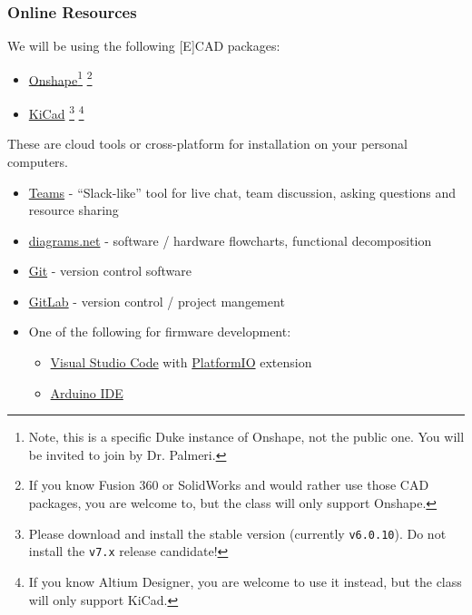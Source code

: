 \subsubsection*{Online Resources}
We will be using the following [E]CAD packages:
\begin{itemize}
    \item \href{https://duke.onshape.com}{Onshape}\footnote{Note, this is a
    specific Duke instance of Onshape, not the public one.  You will be invited
    to join by Dr. Palmeri.}
    \footnote{If you know Fusion 360 or SolidWorks and would rather use those CAD
    packages, you are welcome to, but the class will only support Onshape.}
    \item \href{https://kicad.org/}{KiCad}
    \footnote{Please download and install the stable version (currently \texttt{v6.0.10}). Do not install the
    \texttt{v7.x} release candidate!}
    \footnote{If you know Altium Designer, you are welcome to use it instead, but
    the class will only support KiCad.}
\end{itemize}

These are cloud tools or cross-platform for installation on your personal computers.

\begin{itemize}
    \item \href{https://teams.microsoft.com}{Teams} - ``Slack-like'' tool for live
    chat, team discussion, asking questions and resource sharing
    \item \href{https://diagrams.net}{diagrams.net} - software / hardware flowcharts, functional decomposition
    \item \href{https://git-scm.com/}{Git} - version control software
    \item \href{https://gitlab.oit.duke.edu}{GitLab} - version control / project mangement
    \item One of the following for firmware development:
    \begin{itemize}
        \item \href{https://code.visualstudio.com/}{Visual Studio Code} with \href{https://platformio.org/}{PlatformIO} extension
        \item \href{https://www.arduino.cc/en/software}{Arduino IDE}
    \end{itemize}
\end{itemize}